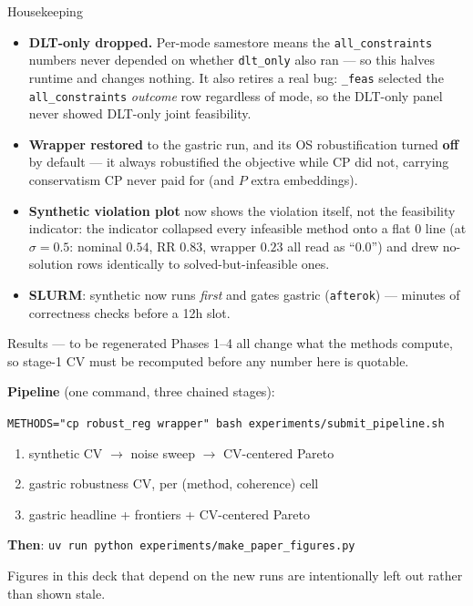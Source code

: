 \documentclass{beamer}
\begin{document}
\begin{frame}{Housekeeping}
  \small
  \begin{itemize}
    \item \textbf{DLT-only dropped.} Per-mode samestore means the
      \texttt{all\_constraints} numbers never depended on whether
      \texttt{dlt\_only} also ran --- so this halves runtime and changes nothing.
      It also retires a real bug: \texttt{\_feas} selected the
      \texttt{all\_constraints} \emph{outcome} row regardless of mode, so the
      DLT-only panel never showed DLT-only joint feasibility.
    \item \textbf{Wrapper restored} to the gastric run, and its OS robustification
      turned \textbf{off} by default --- it always robustified the objective while
      CP did not, carrying conservatism CP never paid for (and $P$ extra
      embeddings).
    \item \textbf{Synthetic violation plot} now shows the violation itself, not the
      feasibility indicator: the indicator collapsed every infeasible method onto a
      flat 0 line (at $\sigma=0.5$: nominal $0.54$, RR $0.83$, wrapper $0.23$ all
      read as ``0.0'') and drew no-solution rows identically to
      solved-but-infeasible ones.
    \item \textbf{SLURM}: synthetic now runs \emph{first} and gates gastric
      (\texttt{afterok}) --- minutes of correctness checks before a 12h slot.
  \end{itemize}
\end{frame}

\begin{frame}{Results --- to be regenerated}
  \small
  Phases 1--4 all change what the methods compute, so stage-1 CV must be recomputed
  before any number here is quotable.
  \medskip

  \textbf{Pipeline} (one command, three chained stages):
  \begin{center}\footnotesize
  \texttt{METHODS="cp robust\_reg wrapper" bash experiments/submit\_pipeline.sh}
  \end{center}
  \begin{enumerate}\footnotesize
    \item synthetic CV $\to$ noise sweep $\to$ CV-centered Pareto
    \item gastric robustness CV, per (method, coherence) cell
    \item gastric headline + frontiers + CV-centered Pareto
  \end{enumerate}
  \medskip
  \textbf{Then}: \texttt{uv run python experiments/make\_paper\_figures.py}
  \medskip

  \footnotesize
  Figures in this deck that depend on the new runs are intentionally left out
  rather than shown stale.
\end{frame}
\end{document}
